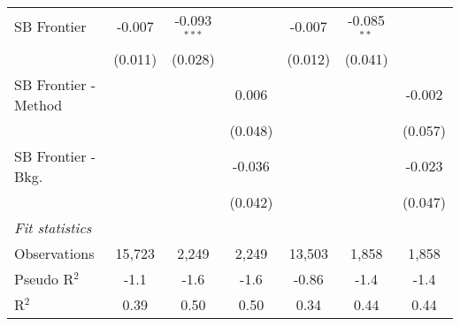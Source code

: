 \begin{tabular}{lcccccc}
   SB Frontier          & -0.007  & -0.093$^{***}$ &         & -0.007       & -0.085$^{**}$ &   \\   
                        & (0.011) & (0.028)        &         & (0.012)      & (0.041)       &   \\   
   SB Frontier - Method &         &                & 0.006   &              &               & -0.002\\   
                        &         &                & (0.048) &              &               & (0.057)\\   
   SB Frontier - Bkg.   &         &                & -0.036  &              &               & -0.023\\   
                        &         &                & (0.042) &              &               & (0.047)\\   
   \midrule
   \emph{Fit statistics}\\
   Observations         & 15,723  & 2,249          & 2,249   & 13,503       & 1,858         & 1,858\\  
   Pseudo R$^2$         & -1.1    & -1.6           & -1.6    & -0.86        & -1.4          & -1.4\\  
   R$^2$                & 0.39    & 0.50           & 0.50    & 0.34         & 0.44          & 0.44\\  
   

\end{tabular}
